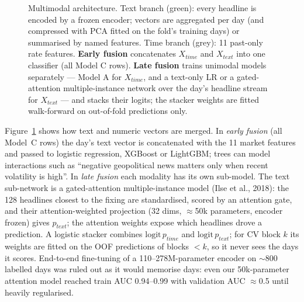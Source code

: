 \documentclass[10pt,a4paper]{article}
\begin{document}
\begin{figure}[t]
{}
\caption{Multimodal architecture. Text branch (green): every headline is encoded by a frozen encoder; vectors are aggregated per day (and compressed with PCA fitted on the fold's training days) or summarised by named features. Time branch (grey): 11 past-only rate features. \textbf{Early fusion} concatenates $X_{time}$ and $X_{text}$ into one classifier (all Model C rows). \textbf{Late fusion} trains unimodal models separately --- Model A for $X_{time}$, and a text-only LR or a gated-attention multiple-instance network over the day's headline stream for $X_{text}$ --- and stacks their logits; the stacker weights are fitted walk-forward on out-of-fold predictions only.}
\label{fig:arch}
\end{figure}
Figure~\ref{fig:arch} shows how text and numeric vectors are merged. In \emph{early fusion} (all Model~C rows) the day's text vector is concatenated with the 11 market features and passed to logistic regression, XGBoost or LightGBM; trees can model interactions such as ``negative geopolitical news matters only when recent volatility is high''. In \emph{late fusion} each modality has its own sub-model. The text sub-network is a gated-attention multiple-instance model (Ilse et al., 2018): the 128 headlines closest to the fixing are standardised, scored by an attention gate, and their attention-weighted projection (32 dims, $\approx$50k parameters, encoder frozen) gives $p_{text}$; the attention weights expose which headlines drove a prediction. A logistic stacker combines $\mathrm{logit}\,p_{time}$ and $\mathrm{logit}\,p_{text}$; for CV block $k$ its weights are fitted on the OOF predictions of blocks $<k$, so it never sees the days it scores. End-to-end fine-tuning of a 110--278M-parameter encoder on $\sim$800 labelled days was ruled out as it would memorise days: even our 50k-parameter attention model reached train AUC 0.94--0.99 with validation AUC $\approx$0.5 until heavily regularised.
\end{document}
